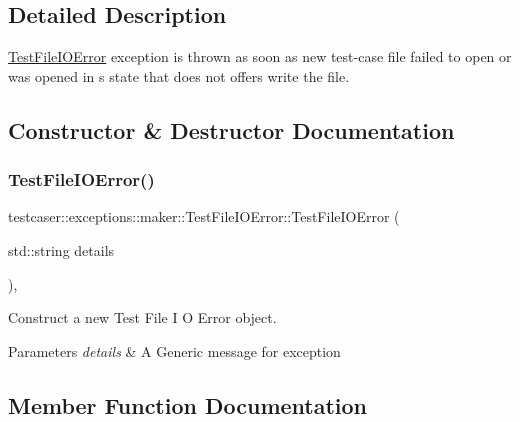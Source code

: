 \subsection{Detailed Description}
\mbox{\hyperlink{classtestcaser_1_1exceptions_1_1maker_1_1TestFileIOError}{Test\+File\+I\+O\+Error}} exception is thrown as soon as new test-\/case file failed to open or was opened in s state that does not offers write the file. 



\subsection{Constructor \& Destructor Documentation}
\mbox{\label{classtestcaser_1_1exceptions_1_1maker_1_1TestFileIOError_a2168ea54454727b86b6e00e5cd8103e0}} 
\subsubsection{\texorpdfstring{TestFileIOError()}{TestFileIOError()}}
{\footnotesize\ttfamily testcaser\+::exceptions\+::maker\+::\+Test\+File\+I\+O\+Error\+::\+Test\+File\+I\+O\+Error (\begin{DoxyParamCaption}\item[{std\+::string}]{details }\end{DoxyParamCaption})\hspace{0.3cm}{\ttfamily [inline]}, {\ttfamily [explicit]}}



Construct a new Test File I O Error object. 


\begin{DoxyParams}{Parameters}
{\em details} & A Generic message for exception \\
\hline
\end{DoxyParams}


\subsection{Member Function Documentation}
\mbox{\label{classtestcaser_1_1exceptions_1_1maker_1_1TestFileIOError_ab83e748d26f860c9b045535447a383c5}} 

